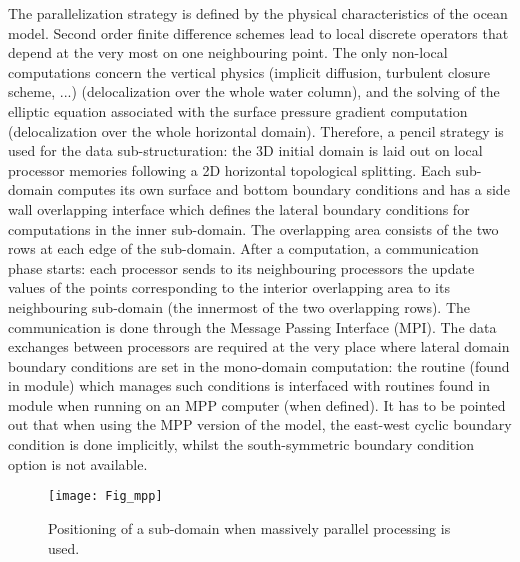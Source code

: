 \documentclass[../main/NEMO_manual]{subfiles}
\begin{document}
The parallelization strategy is defined by the physical characteristics of the ocean model.
Second order finite difference schemes lead to local discrete operators that
depend at the very most on one neighbouring point.
The only non-local computations concern the vertical physics
(implicit diffusion, turbulent closure scheme, ...) (delocalization over the whole water column),
and the solving of the elliptic equation associated with the surface pressure gradient computation
(delocalization over the whole horizontal domain).
Therefore, a pencil strategy is used for the data sub-structuration:
the 3D initial domain is laid out on local processor memories following a 2D horizontal topological splitting.
Each sub-domain computes its own surface and bottom boundary conditions and
has a side wall overlapping interface which defines the lateral boundary conditions for
computations in the inner sub-domain.
The overlapping area consists of the two rows at each edge of the sub-domain.
After a computation, a communication phase starts:
each processor sends to its neighbouring processors the update values of the points corresponding to
the interior overlapping area to its neighbouring sub-domain (\ie the innermost of the two overlapping rows).
The communication is done through the Message Passing Interface (MPI).
The data exchanges between processors are required at the very place where
lateral domain boundary conditions are set in the mono-domain computation:
the  routine (found in  module) which manages such conditions is interfaced with
routines found in  module when running on an MPP computer (\ie when  defined).
It has to be pointed out that when using the MPP version of the model,
the east-west cyclic boundary condition is done implicitly,
whilst the south-symmetric boundary condition option is not available.

\begin{figure}[!t]
  \begin{center}
    \texttt{[image: Fig\_mpp]}
    \caption{
      \protect\label{fig:mpp}
      Positioning of a sub-domain when massively parallel processing is used.
    }
  \end{center}
\end{figure}
\end{document}
